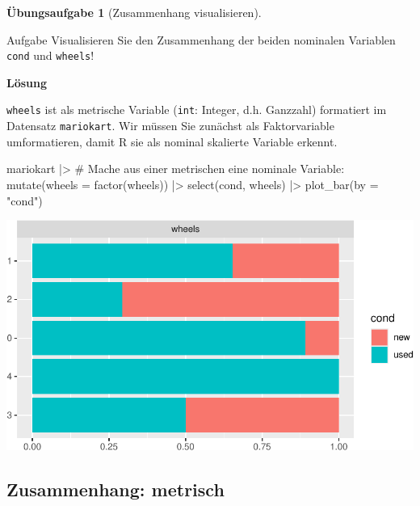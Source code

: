\documentclass[
  letterpaper,
]{scrbook}
\newenvironment{Shaded}{\begin{snugshade}}{\end{snugshade}}
\newcommand{\AttributeTok}[1]{\textcolor[rgb]{0.40,0.45,0.13}{#1}}
\newcommand{\CommentTok}[1]{\textcolor[rgb]{0.37,0.37,0.37}{#1}}
\newcommand{\FunctionTok}[1]{\textcolor[rgb]{0.28,0.35,0.67}{#1}}
\newcommand{\NormalTok}[1]{\textcolor[rgb]{0.00,0.23,0.31}{#1}}
\newcommand{\SpecialCharTok}[1]{\textcolor[rgb]{0.37,0.37,0.37}{#1}}
\newcommand{\StringTok}[1]{\textcolor[rgb]{0.13,0.47,0.30}{#1}}
\theoremstyle{definition}
\theoremstyle{definition}
\theoremstyle{definition}
\newtheorem{exercise}{Übungsaufgabe}[chapter]
\theoremstyle{remark}
\begin{document}
\begin{exercise}[Zusammenhang
visualisieren]\protect\hypertarget{exr-zsmnhang-cond-wheels}{}\label{exr-zsmnhang-cond-wheels}

Aufgabe Visualisieren Sie den Zusammenhang der beiden nominalen
Variablen \texttt{cond} und \texttt{wheels}!

\textbf{Lösung}

\texttt{wheels} ist als metrische Variable (\texttt{int}: Integer, d.h.
Ganzzahl) formatiert im Datensatz \texttt{mariokart}. Wir müssen Sie
zunächst als Faktorvariable umformatieren, damit R sie als nominal
skalierte Variable erkennt.

\begin{Shaded}
\begin{Highlighting}[]
\NormalTok{mariokart }\SpecialCharTok{|\textgreater{}} 
  \CommentTok{\# Mache aus einer metrischen eine nominale Variable: }
  \FunctionTok{mutate}\NormalTok{(}\AttributeTok{wheels =} \FunctionTok{factor}\NormalTok{(wheels)) }\SpecialCharTok{|\textgreater{}} 
  \FunctionTok{select}\NormalTok{(cond, wheels) }\SpecialCharTok{|\textgreater{}} 
  \FunctionTok{plot\_bar}\NormalTok{(}\AttributeTok{by =} \StringTok{"cond"}\NormalTok{)}
\end{Highlighting}
\end{Shaded}

\begin{center}
\includegraphics[width=0.7\linewidth,height=\textheight,keepaspectratio]{040-verbildlichen_files/figure-pdf/unnamed-chunk-20-1.pdf}
\end{center}

\end{exercise}

\subsection{Zusammenhang: metrisch}\label{sec-zshg-metr}
\end{document}
